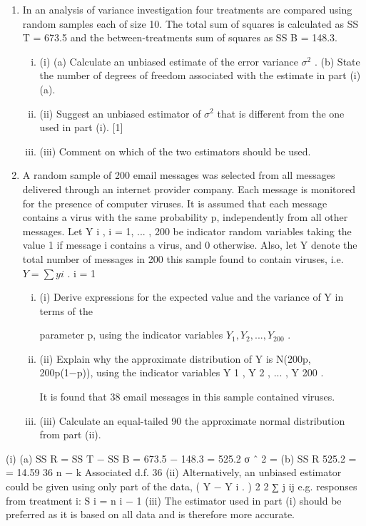 \documentclass[a4paper,12pt]{article}
\begin{document}
\begin{enumerate}

\item In an analysis of variance investigation four treatments are compared using random
samples each of size 10. The total sum of squares is calculated as SS T = 673.5 and the
between-treatments sum of squares as SS B = 148.3.
\begin{enumerate}[(i)]
\item (i)
(a) Calculate an unbiased estimate of the error variance $\sigma^2$ .
(b) State the number of degrees of freedom associated with the estimate in
part (i)(a).

\item (ii) Suggest an unbiased estimator of $\sigma^2$ that is different from the one used in part
(i).
[1]
\item (iii) Comment on which of the two estimators should be used.
\end{enumerate}

\item %
A random sample of 200 email messages was selected from all messages delivered through an internet provider company. Each message is monitored for the presence of
computer viruses. It is assumed that each message contains a virus with the same
probability p, independently from all other messages.
Let Y i , i = 1, ... , 200 be indicator random variables taking the value 1 if message i
contains a virus, and 0 otherwise. Also, let Y denote the total number of messages in
200
this sample found to contain viruses, i.e. $Y = \sum y i$ .
i = 1
\begin{enumerate}[(i)]
    \item (i) Derive expressions for the expected value and the variance of Y in terms of the

parameter p, using the indicator variables $Y_1 , Y_2 , ... , Y_200$ .
\item (ii) Explain why the approximate distribution of Y is N(200p, 200p(1−p)), using
the indicator variables Y 1 , Y 2 , ... , Y 200 .

It is found that 38 email messages in this sample contained viruses.
\item (iii)
Calculate an equal-tailed 90%
the approximate normal distribution from part (ii).
\end{enumerate}


\end{enumerate}
(i)
(a) SS R = SS T − SS B = 673.5 − 148.3 = 525.2
σ ˆ 2 =
(b)
SS R 525.2
=
= 14.59
36
n − k
Associated d.f. 36
(ii) Alternatively, an unbiased estimator could be given using only part of the data,
( Y − Y i . ) 2
2 ∑ j ij
e.g. responses from treatment i: S i =
n i − 1
(iii) The estimator used in part (i) should be preferred as it is based on all data and
is therefore more accurate.
\end{document}
